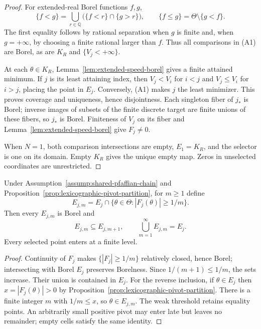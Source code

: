 \begin{proof}
For extended-real Borel functions $f,g$,
\[
\{f<g\}=\bigcup_{r\in\mathbb Q}
\bigl(\{f<r\}\cap\{g>r\}\bigr),
\qquad
\{f\leq g\}=\Theta\setminus\{g<f\}.
\tag{A2}
\]
The first equality follows by rational separation when $g$ is finite and,
when $g=+\infty$, by choosing a finite rational larger than $f$.  Thus all
comparisons in \textup{(A1)} are Borel, as are $K_R$ and
$\{V_j<+\infty\}$.

At each $\theta\in K_R$, Lemma~\ref{lem:extended-speed-borel} gives a
finite attained minimum.  If $j$ is its least attaining index, then
$V_j<V_i$ for $i<j$ and $V_j\leq V_i$ for $i>j$, placing the point in
$E_j$.  Conversely, \textup{(A1)} makes $j$ the least minimizer.  This
proves coverage and uniqueness, hence disjointness.  Each singleton fiber
of $j_*$ is Borel; inverse images of subsets of the finite discrete target
are finite unions of these fibers, so $j_*$ is Borel.  Finiteness of $V_j$
on its fiber and Lemma~\ref{lem:extended-speed-borel} give $F_j\neq0$.

When $N=1$, both comparison intersections are empty, $E_1=K_R$, and the
selector is one on its domain.  Empty $K_R$ gives the unique empty map.
Zeros in unselected coordinates are unrestricted.
\end{proof}

\begin{lemma}
\label{lem:denominator-exhaustion}
Under Assumption~\ref{assump:shared-pfaffian-chain} and
Proposition~\ref{prop:lexicographic-pivot-partition}, for $m\geq1$ define
\[
E_{j,m}=E_j\cap\{\theta\in\Theta:|F_j(\theta)|\geq1/m\}.
\]
Then every $E_{j,m}$ is Borel and
\[
E_{j,m}\subseteq E_{j,m+1},
\qquad
\bigcup_{m=1}^\infty E_{j,m}=E_j.
\tag{A3}
\]
Every selected point enters at a finite level.
\end{lemma}

\begin{proof}
Continuity of $F_j$ makes $\{|F_j|\geq1/m\}$ relatively closed, hence
Borel; intersecting with Borel $E_j$ preserves Borelness.  Since
$1/(m+1)\leq1/m$, the sets increase.  Their union is contained in $E_j$.
For the reverse inclusion, if $\theta\in E_j$ then
$x=|F_j(\theta)|>0$ by Proposition~\ref{prop:lexicographic-pivot-partition}.
There is a finite integer $m$ with $1/m\leq x$, so
$\theta\in E_{j,m}$.  The weak threshold retains equality points.  An
arbitrarily small positive pivot may enter late but leaves no remainder;
empty cells satisfy the same identity.
\end{proof}

